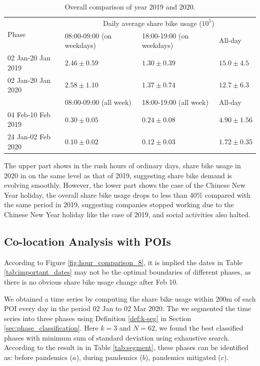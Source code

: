 \documentclass[ijgi,submit,moreauthors,pdftex]{Definitions/mdpi}
\begin{document}
\begin{table}[ht]
    \centering
    \begin{tabular}{|l|l|l|l|}
        \hline
        \multirow{2}{*}{Phase} &\multicolumn{3}{c|}{Daily average share bike usage ($10^{5}$)}\\
        \cline{2-4}
        & 08:00-09:00 (on weekdays) & 18:00-19:00 (on weekdays) & All-day\\
        \hline
        02 Jan-20 Jan 2019 & $2.46\pm0.59$ & $1.30\pm0.39$ & $15.0\pm4.5$\\
        \hline
        02 Jan-20 Jan 2020 & $2.58\pm1.10$ & $1.37\pm0.74$ & $12.7\pm6.3$\\
        \hline
        \hline
        & 08:00-09:00 (all week)  & 18:00-19:00 (all week) & All-day\\
        \hline
        04 Feb-10 Feb 2019 & $0.30\pm0.05$ & $0.24\pm0.08$ & $4.90\pm1.56$\\
        \hline
        24 Jan-02 Feb 2020 & $0.10\pm0.02$ & $0.12\pm0.03$ & $1.72\pm0.35$\\
        \hline
    \end{tabular}
    \caption{Overall comparison of year 2019 and 2020.}
    \label{tab:overall_comparison}
\end{table}

The upper part shows in the rush hours of ordinary days, share bike usage in 2020 in on the same level as that of 2019, suggesting share bike demand is evolving smoothly.
However, the lower part shows the case of the Chinese New Year holiday, the overall share bike usage drops to less than 40\% compared with the same period in 2019, suggesting companies stopped working due to the Chinese New Year holiday like the case of 2019, and social activities also halted. 

\subsection{Co-location Analysis with POIs}\label{sec:colo-poi}

According to Figure \ref{fig:hour_comparison_8}, it is implied the dates in Table \ref{tab:important_dates} may not be the optimal boundaries of different phases, as there is no obvious share bike usage change after Feb 10.

We obtained a time series by computing the share bike usage within 200m of each POI every day in the period 02 Jan to 02 Mar 2020.
The we segmented the time series into three phases using Definition \ref{def:k-seg} in Section \ref{sec:phase_classification}.
Here $k=3$ and $N=62$, we found the best classified phases with minimum sum of standard deviation using exhaustive search.
According to the result in in Table \ref{tab:segment}, these phases can be identified as: before pandemics ($a$), during pandemics ($b$), pandemics mitigated ($c$).
\end{document}
